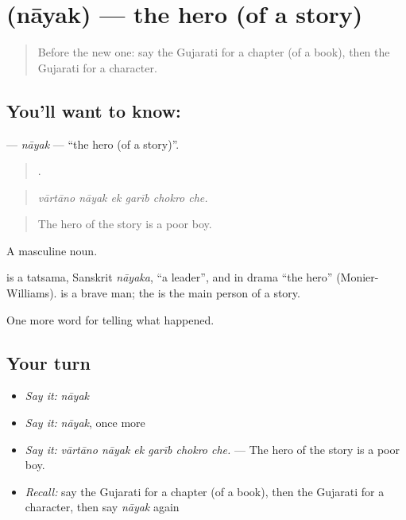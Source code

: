 \section[\texorpdfstring{\gu{નાયક} (nāyak)}{નાયક (nāyak)}]{ (nāyak) — the hero (of a story)}

\label{lesson:GU-C337-nayak}



\begin{quote}
Before the new one: say the Gujarati for a chapter (of a book), then the Gujarati for a character.
\end{quote}

\subsection*{You'll want to know: }
\textbf{} — \emph{nāyak} — \textquotedblleft{}the hero (of a story)\textquotedblright{}.

\begin{quote}
     .
\end{quote}

\begin{quote}
\emph{vārtāno nāyak ek garīb chokro che.}
\end{quote}

\begin{quote}
The hero of the story is a poor boy.
\end{quote}

A masculine noun.

\begin{cousinweb}
is a tatsama, Sanskrit \emph{nāyaka}, \textquotedblleft{}a leader\textquotedblright{}, and in drama \textquotedblleft{}the hero\textquotedblright{} (Monier-Williams). \textbf{} is a brave man; the \textbf{} is the main person of a story.
\end{cousinweb}

\begin{grammarlens}[title={What you've built}]
One more word for telling what happened.
\end{grammarlens}

\subsection*{Your turn}
\begin{itemize}
\raggedright
  \item \emph{Say it:} \emph{nāyak}
  \item \emph{Say it:} \emph{nāyak}, once more
  \item \emph{Say it:} \emph{vārtāno nāyak ek garīb chokro che.} — The hero of the story is a poor boy.
  \item \emph{Recall:} say the Gujarati for a chapter (of a book), then the Gujarati for a character, then say \emph{nāyak} again
\end{itemize}

